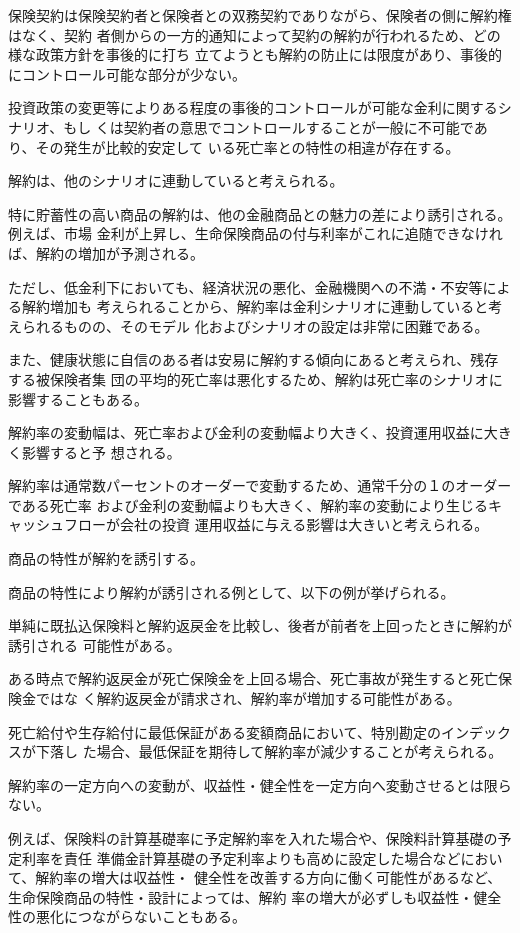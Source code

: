 \documentclass[report,gutter=10mm,fore-edge=10mm,uplatex,dvipdfmx]{jlreq}
\begin{document}
保険契約は保険契約者と保険者との双務契約でありながら、保険者の側に解約権はなく、契約
者側からの一方的通知によって契約の解約が行われるため、どの様な政策方針を事後的に打ち
立てようとも解約の防止には限度があり、事後的にコントロール可能な部分が少ない。

投資政策の変更等によりある程度の事後的コントロールが可能な金利に関するシナリオ、もし
くは契約者の意思でコントロールすることが一般に不可能であり、その発生が比較的安定して
いる死亡率との特性の相違が存在する。

解約は、他のシナリオに連動していると考えられる。

特に貯蓄性の高い商品の解約は、他の金融商品との魅力の差により誘引される。例えば、市場
金利が上昇し、生命保険商品の付与利率がこれに追随できなければ、解約の増加が予測される。

ただし、低金利下においても、経済状況の悪化、金融機関への不満・不安等による解約増加も
考えられることから、解約率は金利シナリオに連動していると考えられるものの、そのモデル
化およびシナリオの設定は非常に困難である。

また、健康状態に自信のある者は安易に解約する傾向にあると考えられ、残存する被保険者集
団の平均的死亡率は悪化するため、解約は死亡率のシナリオに影響することもある。

解約率の変動幅は、死亡率および金利の変動幅より大きく、投資運用収益に大きく影響すると予
想される。

解約率は通常数パーセントのオーダーで変動するため、通常千分の１のオーダーである死亡率
および金利の変動幅よりも大きく、解約率の変動により生じるキャッシュフローが会社の投資
運用収益に与える影響は大きいと考えられる。

商品の特性が解約を誘引する。

商品の特性により解約が誘引される例として、以下の例が挙げられる。

単純に既払込保険料と解約返戻金を比較し、後者が前者を上回ったときに解約が誘引される
可能性がある。

ある時点で解約返戻金が死亡保険金を上回る場合、死亡事故が発生すると死亡保険金ではな
く解約返戻金が請求され、解約率が増加する可能性がある。

死亡給付や生存給付に最低保証がある変額商品において、特別勘定のインデックスが下落し
た場合、最低保証を期待して解約率が減少することが考えられる。

解約率の一定方向への変動が、収益性・健全性を一定方向へ変動させるとは限らない。

例えば、保険料の計算基礎率に予定解約率を入れた場合や、保険料計算基礎の予定利率を責任
準備金計算基礎の予定利率よりも高めに設定した場合などにおいて、解約率の増大は収益性・
健全性を改善する方向に働く可能性があるなど、生命保険商品の特性・設計によっては、解約
率の増大が必ずしも収益性・健全性の悪化につながらないこともある。
\end{document}
